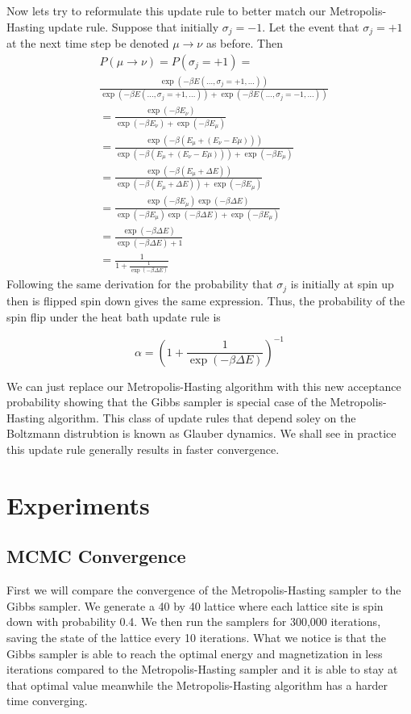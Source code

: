 \documentclass{article}
\begin{document}
Now lets try to reformulate this update rule to better match our Metropolis-Hasting update rule. 
Suppose that initially $\sigma_j = -1$. Let the event that $\sigma_j = +1$ at the next time step be denoted $\mu \rightarrow \nu$ as before.
Then 
\begin{align}
    &P(\mu \rightarrow \nu) = P(\sigma_j = +1) = \\
    &\frac{\exp(-\beta E(\ldots, \sigma_j = +1, \ldots))}{\exp(-\beta E(\ldots, \sigma_j = +1, \ldots)) + \exp(-\beta E(\ldots, \sigma_j = -1, \ldots))} \\
    &= \frac{\exp(-\beta E_{\nu})}{\exp(-\beta E_{\nu}) + \exp(-\beta E_{\mu})} \\
    &= \frac{\exp(-\beta (E_{\mu} + (E_{\nu} - E{\mu})))}{\exp(-\beta (E_{\mu} + (E_{\nu} - E{\mu}))) + \exp(-\beta E_{\mu})} \\
    &= \frac{\exp(-\beta (E_{\mu} + \Delta E))}{\exp(-\beta (E_{\mu} + \Delta E)) + \exp(-\beta E_{\mu})} \\
    &= \frac{\exp(-\beta E_{\mu}) \exp(-\beta \Delta E)}{\exp(-\beta E_{\mu}) \exp(-\beta \Delta E) + \exp(-\beta E_{\mu})} \\
    &= \frac{\exp(-\beta \Delta E)}{\exp(-\beta \Delta E) + 1} \\
    &= \frac{1}{1 + \frac{1}{\exp(-\beta \Delta E)}}
\end{align}
Following the same derivation for the probability that $\sigma_j$ is initially at spin up then is flipped spin down gives the same expression.
Thus, the probability of the spin flip under the heat bath update rule is 

\begin{equation}
    \alpha = \left(1 + \frac{1}{\exp(-\beta \Delta E)}\right)^{-1}
\end{equation}

We can just replace our Metropolis-Hasting algorithm with this new acceptance probability showing that the Gibbs sampler is special case of the Metropolis-Hasting algorithm. 
This class of update rules that depend soley on the Boltzmann distrubtion is known as Glauber dynamics. We shall see in practice this update rule generally results in faster convergence.


\section{Experiments}
\subsection{MCMC Convergence}
    First we will compare the convergence of the Metropolis-Hasting sampler to the Gibbs sampler.
    We generate a 40 by 40 lattice where each lattice site is spin down with probability 0.4. We then run the
    samplers for 300,000 iterations, saving the state of the lattice every 10 iterations. What we notice is that
    the Gibbs sampler is able to reach the optimal energy and magnetization in less iterations compared to the 
    Metropolis-Hasting sampler and it is able to stay at that optimal value meanwhile the Metropolis-Hasting algorithm
    has a harder time converging. 
\end{document}
